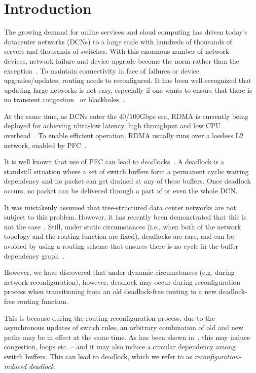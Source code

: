 \section{Introduction}\label{sec:intro}

The growing demand for online services and cloud computing has driven today's
datacenter networks (DCNs) to a large scale with hundreds of thousands of
servers and thousands of switches. With this enormous number of network devices,
network failure and device upgrade become the norm rather than the
exception~\cite{zupdate, ming-paper}. To maintain connectivity in face of
failures or device upgrades/updates, routing needs to reconfigured. It has been
well-recognized that updating large networks is not easy, especially if one
wants to ensure that there is no transient congestion~\cite{zupdate} or
blackholes~\cite{jrex-papers}.

At the same time, as DCNs enter the 40/100Gbps era, RDMA is currently being
deployed for achieving ultra-low latency, high throughput and low CPU
overhead~\cite{dcqcn,timely,cx-sigcomm2016}.  To enable efficient operation,
RDMA usually runs over a  lossless L2 network, enabled by PFC~\cite{dcqcn}.

It is well known that use of PFC can lead to deadlocks~\cite{tcp-bolt}.  A
deadlock is a standstill situation where a set of switch buffers form a
permanent cyclic waiting dependency and no packet can get drained at any of
these buffers. Once deadlock occurs, no packet can be delivered through a part
of or even the whole DCN.

It was mistakenly assumed that tree-structured data center networks are not
subject to this problem. However, it has recently been demonstrated that this is
not the case~\cite{cx-sigcomm2016}. Still, under static circumstances (i.e.,
when both of the network topology and the routing function are fixed), deadlocks
are rare, and can be avoided by using a routing scheme that ensures there is no
cycle in the buffer dependency graph~\cite{tcp-bolt}.

However, we have discovered that under dynamic circumstances (e.g. during
network reconfiguration), however, deadlock may occur during reconfiguration
process when transitioning from an old deadlock-free routing to a new
deadlock-free routing function. 

This is because during the routing reconfiguration process, due to the
asynchronous updates of switch rules, an arbitrary combination of old and new
paths may be in effect at the same time.  As has been shown
in~\cite{zupdate,jrex-papers}, this may induce congestion, loops etc. -- and it
may also induce a circular dependency among switch buffers. This can lead to
deadlock, which we refer to as \textit{reconfiguration-induced deadlock}.

